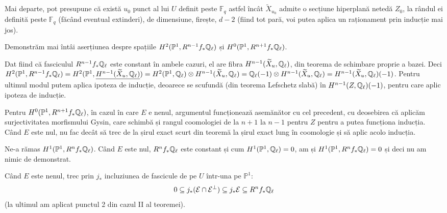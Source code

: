 \documentclass[13pt,openany]{book}
\begin{document}
Mai departe, pot presupune că există $u_0$ punct al lui $U$ definit peste $\mathbb{F}_q$ astfel încât $\widetilde{X}_{u_0}$ admite o secțiune hiperplană netedă $Z_0$, la rândul ei definită peste $\mathbb{F}_q$ (făcând eventual extinderi), de dimensiune, firește, $d-2$ (fiind tot pară, voi putea aplica un raționament prin inducție mai jos).

Demonstrăm mai întâi aserțiunea despre spațiile $H^2(\mathbb{P}^1,R^{n-1} f_* \mathbb{Q}_\ell)$ și $H^0(\mathbb{P}^1,R^{n+1} f_* \mathbb{Q}_\ell)$.

Dat fiind că fasciculul $R^{n-1} f_* \mathbb{Q}_\ell$ este constant în ambele cazuri, el are fibra $H^{n-1}(\widetilde{X}_u,\mathbb{Q}_\ell)$, din teorema de schimbare proprie a bazei. Deci $H^2(\mathbb{P}^1,R^{n-1} f_* \mathbb{Q}_\ell) = H^2(\mathbb{P}^1,\underline{H^{n-1}(\widetilde{X}_u,\mathbb{Q}_\ell)}) = H^2(\mathbb{P}^1,\mathbb{Q}_\ell) \otimes H^{n-1}(\widetilde{X}_u,\mathbb{Q}_\ell) = \mathbb{Q}_\ell(-1)\otimes H^{n-1}(\widetilde{X}_u,\mathbb{Q}_\ell) = H^{n-1}(\widetilde{X}_u,\mathbb{Q}_\ell)(-1)$. Pentru ultimul modul putem aplica ipoteza de inducție, deoarece se scufundă (din teorema Lefschetz slabă) în $H^{n-1}(Z,\mathbb{Q}_\ell)(-1)$, pentru care aplic ipoteza de inducție.

Pentru $H^0(\mathbb{P}^1,R^{n+1} f_* \mathbb{Q}_\ell)$, în cazul în care $E$ e nenul, argumentul funcționează asemănător cu cel precedent, cu deosebirea că aplicăm surjectivitatea morfismului Gysin, care schimbă și rangul coomologiei de la $n+1$ la $n-1$ pentru $Z$ pentru a putea funcționa inducția. Când $E$ este nul, nu fac decât să trec de la șirul exact scurt din teoremă la șirul exact lung în coomologie și să aplic acolo inducția.

Ne-a rămas $H^1(\mathbb{P}^1,R^n f_* \mathbb{Q}_\ell)$. Când $E$ este nul, $R^{n} f_* \mathbb{Q}_\ell$ este constant și cum $H^1(\mathbb{P}^1,\mathbb{Q}_\ell)=0$, am și $H^1(\mathbb{P}^1,R^n f_* \mathbb{Q}_\ell)=0$ și deci nu am nimic de demonstrat.

Când $E$ este nenul, trec prin $j_*$ incluziunea de fascicule de pe $U$ într-una pe $\mathbb{P}^1$:
$$0 \subseteq j_*(\mathcal{E} \cap \mathcal{E}^\perp) \subseteq j_*\mathcal{E} \subseteq R^n f_* \mathbb{Q}_\ell$$
(la ultimul am aplicat punctul 2 din cazul II al teoremei).
\end{document}
